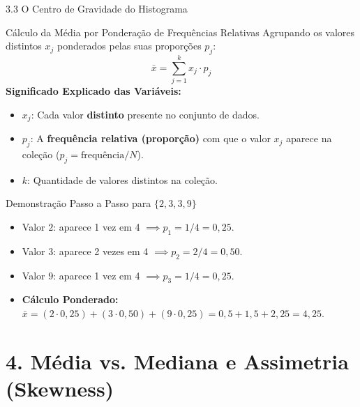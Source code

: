 \documentclass[10pt, aspectratio=169]{beamer}
\begin{document}
\begin{frame}{3.3 O Centro de Gravidade do Histograma}
    \vspace{-0.2cm}
    \begin{block}{Cálculo da Média por Ponderação de Frequências Relativas}
        Agrupando os valores distintos $x_j$ ponderados pelas suas proporções $p_j$:
        \vspace{-0.5cm}
        \[ \bar{x} = \sum_{j=1}^k x_j \cdot p_j \]
        \textbf{Significado Explicado das Variáveis:}
        \begin{itemize}
            \item $x_j$: Cada valor \textbf{distinto} presente no conjunto de dados.
            \item $p_j$: A \textbf{frequência relativa (proporção)} com que o valor $x_j$ aparece na coleção ($p_j = \text{frequência}/N$).
            \item $k$: Quantidade de valores distintos na coleção.
        \end{itemize}
    \end{block}

    \begin{exampleblock}{Demonstração Passo a Passo para $\{2, 3, 3, 9\}$}
        \begin{itemize}
            \item Valor $2$: aparece 1 vez em 4 $\implies p_1 = 1/4 = 0{,}25$.
            \item Valor $3$: aparece 2 vezes em 4 $\implies p_2 = 2/4 = 0{,}50$.
            \item Valor $9$: aparece 1 vez em 4 $\implies p_3 = 1/4 = 0{,}25$.
            \item \textbf{Cálculo Ponderado:} $\bar{x} = (2 \cdot 0{,}25) + (3 \cdot 0{,}50) + (9 \cdot 0{,}25) = 0{,}5 + 1{,}5 + 2{,}25 = 4{,}25$.
        \end{itemize}
    \end{exampleblock}
\end{frame}

\section{4. Média vs. Mediana e Assimetria (Skewness)}
\end{document}

